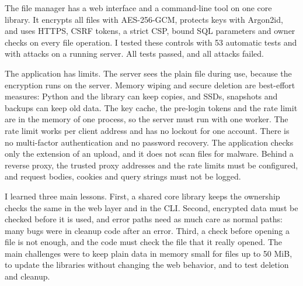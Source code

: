 The file manager has a web interface and a command-line tool on one core library. It encrypts all files with AES-256-GCM, protects keys with Argon2id, and uses HTTPS, CSRF tokens, a strict CSP, bound SQL parameters and owner checks on every file operation. I tested these controls with 53 automatic tests and with attacks on a running server. All tests passed, and all attacks failed.

The application has limits. The server sees the plain file during use, because the encryption runs on the server. Memory wiping and secure deletion are best-effort measures: Python and the library can keep copies, and SSDs, snapshots and backups can keep old data. The key cache, the pre-login tokens and the rate limit are in the memory of one process, so the server must run with one worker. The rate limit works per client address and has no lockout for one account. There is no multi-factor authentication and no password recovery. The application checks only the extension of an upload, and it does not scan files for malware. Behind a reverse proxy, the trusted proxy addresses and the rate limits must be configured, and request bodies, cookies and query strings must not be logged.

I learned three main lessons. First, a shared core library keeps the ownership checks the same in the web layer and in the CLI. Second, encrypted data must be checked before it is used, and error paths need as much care as normal paths: many bugs were in cleanup code after an error. Third, a check before opening a file is not enough, and the code must check the file that it really opened. The main challenges were to keep plain data in memory small for files up to 50 MiB, to update the libraries without changing the web behavior, and to test deletion and cleanup.

